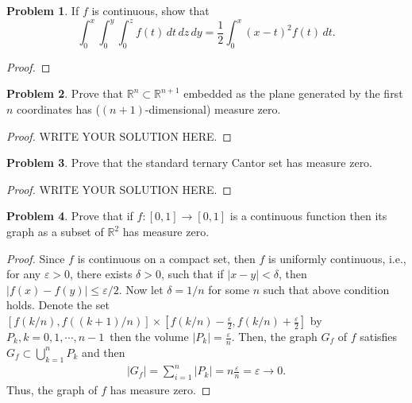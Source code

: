 \documentclass[11pt]{article}
\theoremstyle{definition}
\newtheorem{problem}{Problem}
\theoremstyle{definition}
\begin{document}
\medskip


\begin{problem}
If $f$ is continuous, show that
$$
\int_0^x\int_0^y\int_0^z f(t)\, dt\, dz\, dy =
\frac{1}{2}\int_0^x (x-t)^2f(t)\, dt.
$$
\end{problem}
\begin{proof}

\end{proof}


\medskip

\begin{problem}
Prove that $\mathbb{R}^n\subset\mathbb{R}^{n+1}$ embedded as the plane generated by the first $n$ coordinates has ($(n+1)$-dimensional) measure zero.
\end{problem}
\begin{proof}
	WRITE YOUR SOLUTION HERE.
\end{proof}


\medskip

\begin{problem}
Prove that the standard ternary Cantor set has measure zero.
\end{problem}

\begin{proof}
	WRITE YOUR SOLUTION HERE.
\end{proof}


\medskip

\begin{problem}
Prove that if $f:[0,1]\to [0,1]$ is a continuous function then its graph as
a subset of $\mathbb{R}^2$ has measure zero.
\end{problem}
\begin{proof}
Since $f$ is continuous on a compact set, then $f$ is uniformly continuous, i.e., for any $\varepsilon > 0$, there exists $\delta > 0$, such that if $|x - y| < \delta$, then $|f(x) - f(y)| \leq \varepsilon/2$. Now let $\delta = 1/n$ for some $n$ such that above condition holds. Denote the set $\left[f\left(k/n\right), f\left((k+1)/n\right)\right] \times \left[f\left(k/n\right) - \frac{\varepsilon}{2}, f\left(k/n\right) + \frac{\varepsilon}{2}\right]$ by $P_k, k = 0,1,\cdots,n-1$\, then the volume $|P_k| = \frac{\varepsilon}{n}$. Then, the graph $G_f$ of $f$ satisfies $G_f \subset \bigcup^n_{k=1} P_k$ and then 
\begin{align*}
    |G_f| = \sum^n_{i=1} |P_k| = n \frac{\varepsilon}{n} = \varepsilon \to 0.
\end{align*}
Thus, the graph of $f$ has measure zero.
\end{proof}
\end{document}
